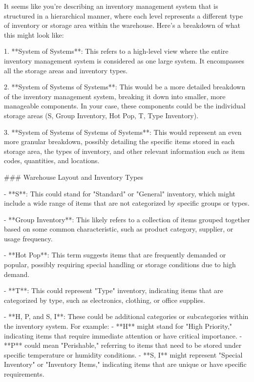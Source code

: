 It seems like you're describing an inventory management system that is structured in a hierarchical manner, where each level represents a different type of inventory or storage area within the warehouse. Here's a breakdown of what this might look like:

1. **System of Systems**: This refers to a high-level view where the entire inventory management system is considered as one large system. It encompasses all the storage areas and inventory types.

2. **System of Systems of Systems**: This would be a more detailed breakdown of the inventory management system, breaking it down into smaller, more manageable components. In your case, these components could be the individual storage areas (S, Group Inventory, Hot Pop, T, Type Inventory).

3. **System of Systems of Systems of Systems**: This would represent an even more granular breakdown, possibly detailing the specific items stored in each storage area, the types of inventory, and other relevant information such as item codes, quantities, and locations.

### Warehouse Layout and Inventory Types

- **S**: This could stand for "Standard" or "General" inventory, which might include a wide range of items that are not categorized by specific groups or types.
  
- **Group Inventory**: This likely refers to a collection of items grouped together based on some common characteristic, such as product category, supplier, or usage frequency.

- **Hot Pop**: This term suggests items that are frequently demanded or popular, possibly requiring special handling or storage conditions due to high demand.

- **T**: This could represent "Type" inventory, indicating items that are categorized by type, such as electronics, clothing, or office supplies.

- **H, P, and S, I**: These could be additional categories or subcategories within the inventory system. For example:
  - **H** might stand for "High Priority," indicating items that require immediate attention or have critical importance.
  - **P** could mean "Perishable," referring to items that need to be stored under specific temperature or humidity conditions.
  - **S, I** might represent "Special Inventory" or "Inventory Items," indicating items that are unique or have specific requirements.


